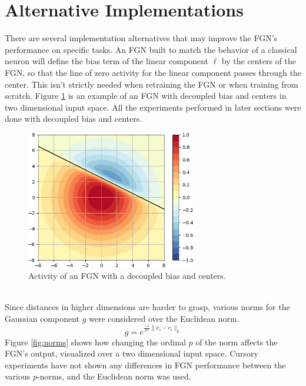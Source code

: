 \documentclass[12pt,oneside]{CUNY_PhD}
\begin{document}
\section{Alternative Implementations}
There are several implementation alternatives that may improve the FGN's performance on specific tasks. 
\indent An FGN built to match the behavior of a classical neuron will define the bias term of the linear component $\ell$ by the centers of the FGN, so that the line of zero activity for the linear component passes through the center. This isn't strictly needed when retraining the FGN or when training from scratch. Figure \ref{fig:decoupled} is an example of an FGN with decoupled bias and centers in two dimensional input space. All the experiments performed in later sections were done with decoupled bias and centers.
\begin{figure}[!htbp]
    \centering
    \includegraphics[width=0.66\textwidth]{images/2D-Decoupled/var-decoupled-center-activity-cropped.png}
    \caption{Activity of an FGN with a decoupled bias and centers.}
    \label{fig:decoupled}
\end{figure}\\
\indent Since distances in higher dimensions are harder to grasp, various norms for the Gaussian component $g$ were considered over the Euclidean norm.
\[g = e^{\frac{-1}{\sigma^2}\lVert x_i-c_i \lVert_p }\]
Figure \ref{fig:norms} shows how changing the ordinal $p$ of the norm affects the FGN's output, visualized over a two dimensional input space. Cursory experiments have not shown any differences in FGN performance between the various $p$-norms, and the Euclidean norm was used.
\end{document}
